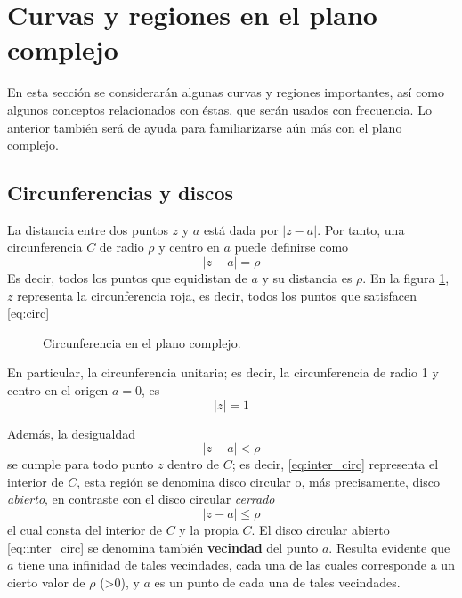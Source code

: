 \section{Curvas y regiones en el plano complejo}
\label{sec:1_curvas_y_regiones_en_el_plano_complejo}

En esta sección se considerarán algunas curvas y regiones importantes, así como algunos conceptos relacionados con éstas, que serán usados con frecuencia. Lo anterior también será de ayuda para familiarizarse aún más con el plano complejo.

\subsection{Circunferencias y discos}

La distancia entre dos puntos $z$ y $a$ está dada por $\lvert z-a \rvert$. Por tanto, una circunferencia $C$ de radio $\rho$ y centro en $a$ puede definirse como
\begin{equation}
  \lvert z-a \rvert = \rho
  \label{eq:circ}
\end{equation}
Es decir, todos los puntos que equidistan de $a$ y su distancia es $\rho$. En la figura \ref{fig:circ_compx}, $z$ representa la circunferencia roja, es decir, todos los puntos que satisfacen \ref{eq:circ}
\begin{figure}[ht]
  \centering
  \caption{Circunferencia en el plano complejo.}
  \label{fig:circ_compx}
\end{figure}

En particular, la circunferencia unitaria; es decir, la circunferencia de radio 1 y centro en el origen $a=0$, es
\begin{equation*}
  \lvert z \rvert = 1
\end{equation*}

Además, la desigualdad
\begin{equation}
  \lvert z - a \rvert < \rho
  \label{eq:inter_circ}
\end{equation}
se cumple para todo punto $z$ dentro de $C$; es decir, \ref{eq:inter_circ} representa el interior de $C$, esta región se denomina disco circular o, más precisamente, disco \textit{abierto}, en contraste con el disco circular \textit{cerrado}
\begin{equation*}
  \lvert z-a \rvert \leqslant \rho
\end{equation*}
el cual consta del interior de $C$ y la propia $C$. El disco circular abierto \ref{eq:inter_circ} se denomina también \textbf{vecindad} del punto $a$. Resulta evidente que $a$ tiene una infinidad de tales vecindades, cada una de las cuales corresponde a un cierto valor de $\rho$ (>0), y $a$ es un punto de cada una de tales vecindades.
\label{word:vecindad}

